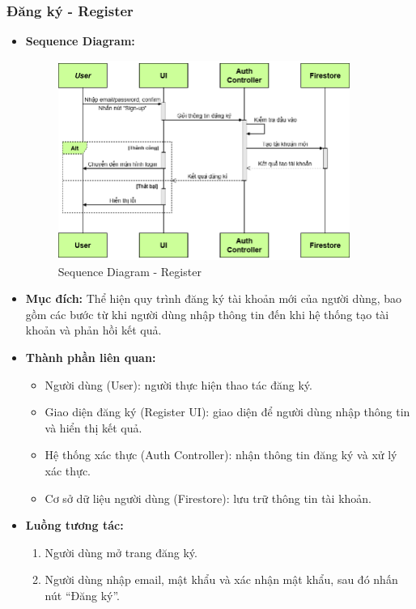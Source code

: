 \documentclass[a4paper]{article}
\begin{document}
\subsubsection{Đăng ký - Register}
\begin{itemize}
	\item \textbf{Sequence Diagram:}
	      \begin{figure}[H]
		      \centering
		      \includegraphics[width=0.9\textwidth]{Images/register_sequence.png}
		      \caption{Sequence Diagram - Register}
	      \end{figure}
	\item \textbf{Mục đích:} Thể hiện quy trình đăng ký tài khoản mới của người dùng, bao gồm các bước từ khi người dùng nhập thông tin đến khi hệ thống tạo tài khoản và phản hồi kết quả.
	\item \textbf{Thành phần liên quan:}
	      \begin{itemize}
		      \item Người dùng (User): người thực hiện thao tác đăng ký.
		      \item Giao diện đăng ký (Register UI): giao diện để người dùng nhập thông tin và hiển thị kết quả.
		      \item Hệ thống xác thực (Auth Controller): nhận thông tin đăng ký và xử lý xác thực.
		      \item Cơ sở dữ liệu người dùng (Firestore): lưu trữ thông tin tài khoản.
	      \end{itemize}
	\item \textbf{Luồng tương tác:}
	      \begin{enumerate}
		      \item Người dùng mở trang đăng ký.
		      \item Người dùng nhập email, mật khẩu và xác nhận mật khẩu, sau đó nhấn nút “Đăng ký”.

\end{enumerate}
\end{itemize}
\end{document}
